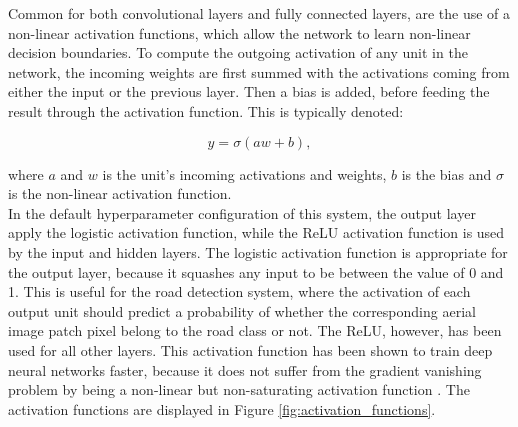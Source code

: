 Common for both convolutional layers and fully connected layers, are the use of a non-linear activation functions, which allow the network to learn non-linear decision boundaries. To compute the outgoing activation of any unit in the network, the incoming weights are first summed with the activations coming from either the input or the previous layer. Then a bias is added, before feeding the result through the activation function. This is typically denoted:

$$ y = \sigma(aw + b),$$

\noindent where $a$ and  $w$ is the unit's incoming activations and weights, $b$ is the bias and $\sigma$ is the non-linear activation function.\\

In the default hyperparameter configuration of this system, the output layer apply the logistic activation function, while the \ac{ReLU} activation function is used by the input and hidden layers. The logistic activation function is appropriate for the output layer, because it squashes any input to be between the value of 0 and 1. This is useful for the road detection system, where the activation of each output unit should predict a probability of whether the corresponding aerial image patch pixel belong to the road class or not. The \ac{ReLU}, however, has been used for all other layers. This activation function has been shown to train deep neural networks faster, because it does not suffer from the gradient vanishing problem by being a non-linear but non-saturating activation function \citep{Krizhevsky_imagenet}.  The activation functions are displayed in Figure \ref{fig:activation_functions}.\\

